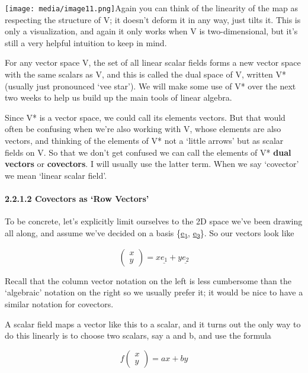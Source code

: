 \documentclass[oneside,english]{amsbook}
\numberwithin{section}{chapter}
\theoremstyle{plain}
\theoremstyle{definition}
\begin{document}
\texttt{[image: media/image11.png]}Again
you can think of the linearity of the map as respecting the structure of
V; it doesn't deform it in any way, just tilts it. This is only a
visualization, and again it only works when V is two-dimensional, but
it's still a very helpful intuition to keep in mind.

For any vector space V, the set of all linear scalar fields forms a new
vector space with the same scalars as V, and this is called the dual
space of V, written V* (usually just pronounced `vee star'). We will
make some use of V* over the next two weeks to help us build up the main
tools of linear algebra.

Since V* is a vector space, we could call its elements vectors. But that
would often be confusing when we're also working with V, whose elements
are also vectors, and thinking of the elements of V* not a `little
arrows' but as scalar fields on V. So that we don't get confused we can
call the elements of V* \textbf{dual vectors} or \textbf{covectors}. I
will usually use the latter term. When we say `covector' we mean
`linear scalar field'.

\paragraph{2.2.1.2 Covectors as `Row
	Vectors'}\label{covectors-as-row-vectors}

To be concrete, let's explicitly limit ourselves to the 2D space we've
been drawing all along, and assume we've decided on a basis
\{\ul{e\textsubscript{1}}, \ul{e\textsubscript{2}}\}. So our vectors
look like

\[\begin{pmatrix}
	x \\
	y
\end{pmatrix} = x\underline{e_{1}} + y\underline{e_{2}}\]

Recall that the column vector notation on the left is less cumbersome
than the `algebraic' notation on the right so we usually prefer it; it
would be nice to have a similar notation for covectors.

A scalar field maps a vector like this to a scalar, and it turns out the
only way to do this linearly is to choose two scalars, say a and b, and
use the formula

\[f\begin{pmatrix}
	x \\
	y
\end{pmatrix} = ax + by\]
\end{document}
